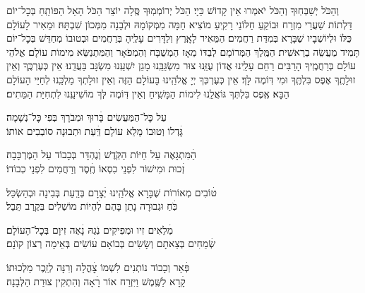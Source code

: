 %
וְהַכֹּל יְשַׁבְּחֽוּךָ \middot וְהַכֹּל יֹאמְרוּ אֵין קָדוֹשׁ כַּיָי׃ הַכֹּל יְרוֹמְמֽוּךָ סֶּֽלָה יוֹצֵר הַכֹּל \middot הָאֵל הַפּוֹתֵֽחַ בְּכׇל־יוֹם דַּלְתוֹת שַׁעֲרֵי מִזְרָח \middot וּבוֹקֵֽעַ חַלּוֹנֵי רָקִֽיעַ מוֹצִיא חַמָּה מִמְּקוֹמָהּ וּלְבָנָה מִמְּכוֹן שִׁבְתָּהּ׃ וּמֵאִיר לָעוֹלָם כֻּלּוֹ וּלְיוֹשְׁבָיו שֶׁבָּרָא בְּמִדַּת רַחֲמִים׃ 
הַמֵּאִיר לָאָֽרֶץ וְלַדָּרִים עָלֶֽיהָ בְּרַחֲמִים \middot וּבְטוּבוֹ מְחַדֵּשׁ בְּכׇל־יוֹם תָּמִיד מַעֲשֵׂה בְרֵאשִׁית׃
הַמֶּֽלֶךְ הַמְּרוֹמָם לְבַדּוֹ מֵאָז \middot הַמְשֻׁבָּח וְהַמְפֹאָר וְהַמִּתְנַשֵּׂא מִימוֹת עוֹלָם׃
אֱלֹהֵי עוֹלָם בְּרַחֲמֶֽיךָ הָרַבִּים רַחֵם עָלֵֽינוּ \middot אֲדוֹן עֻזֵּֽנוּ צוּר מִשְׂגַּבֵּֽנוּ מָגֵן יִשְׁעֵֽנוּ מִשְׂגָּב בַּעֲדֵֽנוּ׃
אֵין כְּעֶרְכֶּֽךָ וְאֵין זוּלָתֶֽךָ \middot אֶפֶס בִּלְתֶּֽךָ וּמִי דּֽוֹמֶה לָּךְ׃
אֵין כְּעֶרְכְּךָ יְיָ אֱלֹהֵֽינוּ בָּעוֹלָם הַזֶּה \middot וְאֵין זוּלָתְךָ מַלְכֵּֽנוּ לְחַיֵּי הָעוֹלָם הַבָּא׃
אֶֽפֶס בִּלְתְּךָ גּוֹאֲלֵֽנוּ לִימוֹת הַמָּשִֽׁיחַ \middot וְאֵין דּֽוֹמֶה לְּךָ מוֹשִׁיעֵֽנוּ לִתְחִיַּת הַמֵּתִים׃

עַל כׇּל־הַמַּעֲשִׂים \hfill בָּׄרוּךְ וּמְבֹרָךְ בְּפִי כׇּל־נְשָׁמָה׃ \\
גׇּׄדְלוֹ וְטוּבוֹ מָלֵא עוֹלָם \hfill דַּֽׄעַת וּתְבוּנָה סוֹבְבִים אוֹתוֹ׃

הַׄמִּתְגָּאֶה עַל חַיּוֹת הַקֹּֽדֶשׁ \hfill וְׄנֶהְדָּר בְּכָבוֹד עַל הַמֶּרְכָּבָה׃\\
זְׄכוּת וּמִישׁוֹר לִפְנֵי כִסְאוֹ \hfill חֶֽׄסֶד וְרַחֲמִים לִפְנֵי כְבוֹדוֹ׃

טׄוֹבִים מְאוֹרוֹת שֶׁבָּרָא אֱלֹהֵֽינוּ \hfill יְׄצָרָם בְּדַֽעַת בְּבִינָה וּבְהַשְׂכֵּל׃\\
כֹּֽׄחַ וּגְבוּרָה נָתַן בָּהֶם \hfill לִׄהְיוֹת מוֹשְׁלִים בְּקֶֽרֶב תֵּבֵל׃

מְׄלֵאִים זִיו וּמְפִיקִים נֹֽגַהּ \hfill נָׄאֶה זִיוָם בְּכׇל־הָעוֹלָם׃ \\
שְׂׄמֵחִים בְּצֵאתָם וְשָׂשִׂים בְּבוֹאָם \hfill עׄוֹשִׂים בְּאֵימָה רְצוֹן קוׂנָם׃

פְּׄאֵר וְכָבוֹד נוֹתְנִים לִשְׁמוֹ \hfill צׇׄהֳלָה וְרִנָּה לְזֵֽכֶר מַלְכוּתוֹ׃ \\
קָׄרָא לַשֶּֽׁמֶשׁ וַיִּזְרַח אוֹר \hfill רָׄאָה וְהִתְקִין צוּרַת הַלְּבָנָה׃

